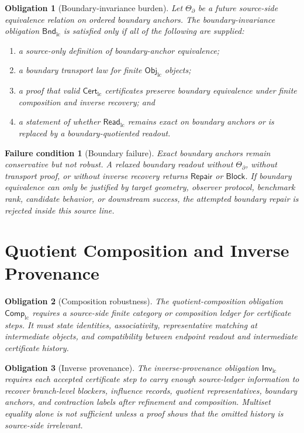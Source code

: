 \documentclass[11pt]{article}
\newcommand{\ObjLC}{\mathsf{Obj}_{\mathrm{lc}}}
\newcommand{\CertLC}{\mathsf{Cert}_{\mathrm{lc}}}
\newcommand{\ReadLC}{\mathsf{Read}_{\mathrm{lc}}}
\newcommand{\BndLC}{\mathsf{Bnd}_{\mathrm{lc}}}
\newcommand{\CompLC}{\mathsf{Comp}_{\mathrm{lc}}}
\newcommand{\InvLC}{\mathsf{Inv}_{\mathrm{lc}}}
\newcommand{\Block}{\mathsf{Block}}
\newcommand{\Repair}{\mathsf{Repair}}
\newtheorem{obligation}{Obligation}
\newtheorem{failurecondition}{Failure condition}
\begin{document}
\begin{obligation}[Boundary-invariance burden]
Let \(\Theta_{\partial}\) be a future source-side equivalence relation
on ordered boundary anchors. The boundary-invariance obligation
\(\BndLC\) is satisfied only if all of the following are supplied:
\begin{enumerate}
    \item a source-only definition of boundary-anchor equivalence;
    \item a boundary transport law for finite \(\ObjLC\) objects;
    \item a proof that valid \(\CertLC\) certificates preserve boundary
    equivalence under finite composition and inverse recovery; and
    \item a statement of whether \(\ReadLC\) remains exact on boundary
    anchors or is replaced by a boundary-quotiented readout.
\end{enumerate}
\end{obligation}

\begin{failurecondition}[Boundary failure]
Exact boundary anchors remain conservative but not robust. A relaxed
boundary readout without \(\Theta_{\partial}\), without transport
proof, or without inverse recovery returns \(\Repair\) or \(\Block\).
If boundary equivalence can only be justified by target geometry,
observer protocol, benchmark rank, candidate behavior, or downstream
success, the attempted boundary repair is rejected inside this source
line.
\end{failurecondition}

\section{Quotient Composition and Inverse Provenance}

\begin{obligation}[Composition robustness]
The quotient-composition obligation \(\CompLC\) requires a source-side
finite category or composition ledger for certificate steps. It must
state identities, associativity, representative matching at
intermediate objects, and compatibility between endpoint readout and
intermediate certificate history.
\end{obligation}

\begin{obligation}[Inverse provenance]
The inverse-provenance obligation \(\InvLC\) requires each accepted
certificate step to carry enough source-ledger information to recover
branch-level blockers, influence records, quotient representatives,
boundary anchors, and contraction labels after refinement and
composition. Multiset equality alone is not sufficient unless a proof
shows that the omitted history is source-side irrelevant.
\end{obligation}
\end{document}
